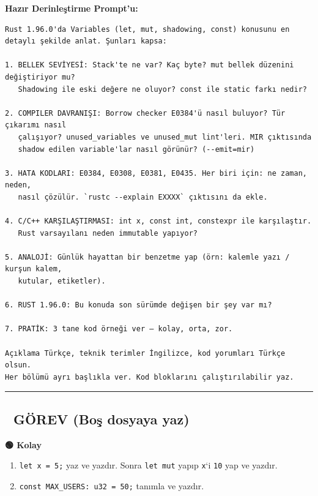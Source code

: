 \documentclass[12pt,a4paper]{article}
\begin{document}
\textbf{Hazır Derinleştirme Prompt'u:}

\begin{verbatim}
Rust 1.96.0'da Variables (let, mut, shadowing, const) konusunu en detaylı şekilde anlat. Şunları kapsa:

1. BELLEK SEVİYESİ: Stack'te ne var? Kaç byte? mut bellek düzenini değiştiriyor mu?
   Shadowing ile eski değere ne oluyor? const ile static farkı nedir?

2. COMPILER DAVRANIŞI: Borrow checker E0384'ü nasıl buluyor? Tür çıkarımı nasıl
   çalışıyor? unused_variables ve unused_mut lint'leri. MIR çıktısında
   shadow edilen variable'lar nasıl görünür? (--emit=mir)

3. HATA KODLARI: E0384, E0308, E0381, E0435. Her biri için: ne zaman, neden,
   nasıl çözülür. `rustc --explain EXXXX` çıktısını da ekle.

4. C/C++ KARŞILAŞTIRMASI: int x, const int, constexpr ile karşılaştır.
   Rust varsayılanı neden immutable yapıyor?

5. ANALOJİ: Günlük hayattan bir benzetme yap (örn: kalemle yazı / kurşun kalem,
   kutular, etiketler).

6. RUST 1.96.0: Bu konuda son sürümde değişen bir şey var mı?

7. PRATİK: 3 tane kod örneği ver — kolay, orta, zor.

Açıklama Türkçe, teknik terimler İngilizce, kod yorumları Türkçe olsun.
Her bölümü ayrı başlıkla ver. Kod bloklarını çalıştırılabilir yaz.
\end{verbatim}

\begin{center}\rule{0.5\linewidth}{0.5pt}\end{center}

\subsection{📝 GÖREV (Boş dosyaya yaz)}\label{görev-boş-dosyaya-yaz-1}

\textbf{🟢 Kolay}

\begin{enumerate}
\def\labelenumi{\arabic{enumi}.}
\tightlist
\item
  \texttt{let\ x\ =\ 5;} yaz ve yazdır. Sonra \texttt{let\ mut} yapıp \texttt{x}`i \texttt{10} yap ve yazdır.
\item
  \texttt{const\ MAX\_USERS:\ u32\ =\ 50;} tanımla ve yazdır.
\end{enumerate}
\end{document}
